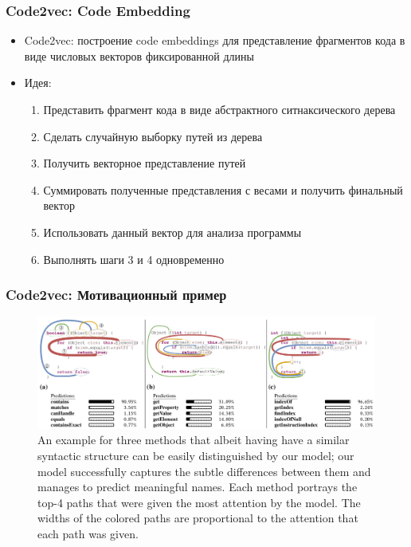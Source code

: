 \documentclass[xcolor=table,english]{beamer}
\begin{document}
\begin{frame}[fragile] \frametitle{Code2vec: Code Embedding}
    \begin{itemize}
        \item Code2vec: построение code embeddings для представление фрагментов кода 
        в виде числовых векторов фиксированной длины
        \item Идея:
        {
            \begin{enumerate}
                \item Представить фрагмент кода в виде абстрактного ситнаксического дерева
                \item Сделать случайную выборку путей из дерева
                \item Получить векторное представление путей
                \item Суммировать полученные представления с весами и получить финальный вектор
                \item Использовать данный вектор для анализа программы
                \item Выполнять шаги 3 и 4 одновременно 
            \end{enumerate}
        }
    \end{itemize}
\end{frame}

\begin{frame}[fragile] \frametitle{Code2vec: Мотивационный пример}
    \begin{minipage}[m]{\linewidth}
        \begin{figure}
            \centering
            \includegraphics[width=\textwidth]{figures/code2vec_motivation_example.png}
            \caption{An example for three methods that albeit having have a similar syntactic structure can be easily distinguished by our model; our model successfully captures the subtle differences between them and manages to predict meaningful names. Each method portrays the top-4 paths that were given the most attention by the model. The widths of the colored paths are proportional to the attention that each path was given.}
        \end{figure}
    \end{minipage}\hfill
\end{frame}
\end{document}
